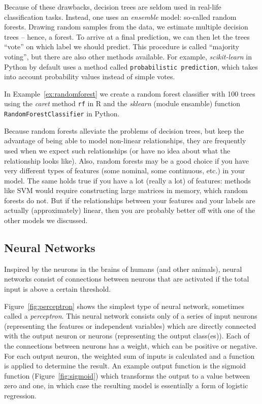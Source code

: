Because of these drawbacks, decision trees are seldom used in
real-life classification tasks.  Instead, one uses an \emph{ensemble} model: so-called random forests.  Drawing random samples from the data, we estimate multiple
decision trees -- hence, a forest.  To arrive at a final prediction,
we can then  let the trees ``vote'' on which label we should
predict. This procedure is called ``majority voting'', but there are
also other methods available. For example, \emph{scikit-learn} in Python  by default uses a method called \texttt{probabilistic prediction}, which takes into
account probability values instead of simple votes.

In Example~\ref{ex:randomforest} we create a random forest classifier with 100 trees using the \emph{caret} method \texttt{rf} in R and the \emph{sklearn} (module ensamble) function \texttt{RandomForestClassifier} in Python.


Because random forests alleviate the problems of decision trees, but
keep the advantage of being able to model non-linear relationships,
they are frequently used when we expect such relationships (or have no
idea about what  the relationship looks like).  Also, random forests may
be a good choice if you have very different types of features (some
nominal, some continuous, etc.) in your model. The same holds true if
you have a lot (really a lot) of features: methods like SVM would require
constructing large matrices in memory, which random forests do not.
But if the relationships between your features and your labels are
actually (approximately) linear, then you are probably better off with
one of the other models we discussed.


\subsection{Neural Networks} \label{sec:neural}

Inspired by the neurons in the brains of humans (and other animals),
neural networks consist of connections between neurons that are activated if the
total input is above a certain threshold.

Figure~\ref{fig:perceptron} shows the simplest type of neural network, sometimes called a \emph{perceptron}.
This neural network consists only of a series of input neurons (representing the features or independent variables)
which are directly connected with the output neuron or neurons (representing the output class(es)).
Each of the connections between neurons has a weight, which can be positive or negative.
For each output neuron, the weighted sum of inputs is calculated and a function is applied to determine the result.
An example output function is the sigmoid function (Figure~\ref{fig:sigmoid}) which transforms the output to a value between zero and one,
in which case the resulting model is essentially a form of logistic regression.

